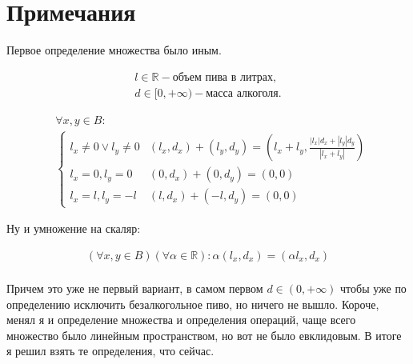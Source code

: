 \section*{Примечания}

Первое определение множества было иным.

\begin{align*}
  l \in \mathbb{R} - \text{объем пива в литрах,} \\
  d \in [0, +\infty)- \text{масса алкоголя.}
\end{align*}

\begin{align*}
   & \forall x, y \in B:                                             \\
   & \begin{cases}
       l_x \neq 0 \lor l_y \neq 0 & (l_x, d_x) + (l_y, d_y) =
       \left(l_x + l_y, \frac{|l_x|d_x + |l_y|d_y}{|l_x + l_y|}\right) \\
       l_x = 0,l_y = 0            & (0, d_x) + (0, d_y) =
       \left(0, 0\right)                                               \\
       l_x = l, l_y = -l          & (l, d_x) + (-l, d_y) =
       \left(0, 0\right)
     \end{cases}
\end{align*}

Ну и умножение на скаляр:

\begin{align*}
  (\forall x,y \in B)(\forall \alpha \in \mathbb{R}):
  \alpha(l_x, d_x) = (\alpha l_x, d_x) \\
\end{align*}

Причем это уже не первый вариант, в самом первом $d \in (0,+\infty)$ чтобы уже по определению исключить безалкогольное пиво, но ничего не вышло. Короче, менял я и определение множества и определения операций, чаще всего множество было линейным пространством, но вот не было евклидовым. В итоге я решил взять те определения, что сейчас.
